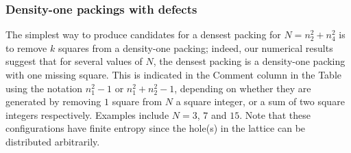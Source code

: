 \documentclass[preprint,aps]{revtex4}
\begin{document}
\begin{figure}[H]
\caption{\label{fig:aligned}}
\end{figure}



\subsubsection{Density-one packings with defects}
\label{sec:defects}
The simplest way to produce candidates for a densest packing for $N=n_2^2 + n_4^2$ is to remove $k$ squares from a density-one packing; indeed, our numerical results suggest that for several values of $N$, the densest packing is a density-one packing with one missing square.  This is indicated in the Comment column in the Table using the notation $n_1^2-1$ or $n_1^2+ n_2^2-1$, depending on whether they are generated by removing $1$ square from $N$ a square integer, or a sum of two square integers respectively. Examples include $N=3$, $7$ and $15$. Note that these configurations have finite entropy since the hole(s) in the lattice can be distributed arbitrarily.

\end{document}
